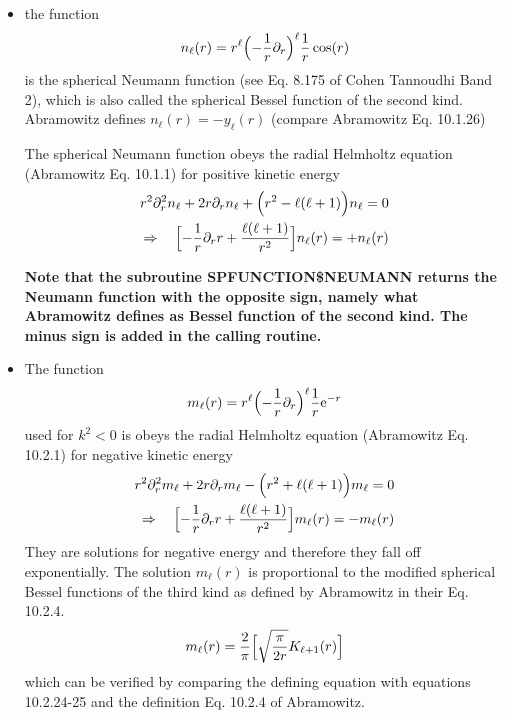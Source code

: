 \documentclass[11pt,a4paper]{report}
\begin{document}
\begin{itemize}
\item the function
\begin{eqnarray}
n_\ell(r)=r^\ell\Bigl(-\frac{1}{r}\partial_r\Bigr)^\ell\frac{1}{r}\cos(r)
\label{eq:defneumann}
\end{eqnarray}
is the spherical Neumann function (see Eq. 8.175 of Cohen Tannoudhi
Band 2), which is also called the spherical Bessel function of the
second kind. Abramowitz defines $n_\ell(r)=-y_\ell(r)$ (compare
Abramowitz Eq. 10.1.26)

The spherical Neumann function obeys the radial Helmholtz equation
(Abramowitz Eq. 10.1.1) for positive kinetic energy
\begin{eqnarray}
r^2\partial^2_r n_\ell+2r\partial_r n_\ell+\Bigl(r^2-\ell(\ell+1)\Bigr) n_\ell=0
\nonumber\\
\Rightarrow\quad
\Bigl[-\frac{1}{r}\partial_r r +\frac{\ell(\ell+1)}{r^2}\Bigr]
n_\ell(r)=+n_\ell(r)
\end{eqnarray}

\textbf{Note that the subroutine SPFUNCTION\$NEUMANN returns the
  Neumann function with the opposite sign, namely what Abramowitz
  defines as Bessel function of the second kind. The minus sign is
  added in the calling routine.}
%
\item The function 
\begin{eqnarray}
m_\ell(r)=r^\ell\Bigl(-\frac{1}{r}\partial_r\Bigr)^\ell\frac{1}{r}\mathrm{e}^{-r}
\label{eq:defml}
\end{eqnarray}
used for $k^2<0$ is obeys the radial Helmholtz equation (Abramowitz
Eq. 10.2.1) for negative kinetic energy
\begin{eqnarray}
r^2\partial^2_r m_\ell
+2r\partial_r m_\ell
-\Bigl(r^2+\ell(\ell+1)\Bigr) m_\ell=0
\nonumber\\
\Rightarrow\quad
\Bigl[-\frac{1}{r}\partial_r r +\frac{\ell(\ell+1)}{r^2}\Bigr]
m_\ell(r)=-m_\ell(r)
\end{eqnarray}
They are solutions for negative energy and therefore they fall off
exponentially.  The solution $m_\ell(r)$ is proportional to the
modified spherical Bessel functions of the third kind as defined by
Abramowitz\cite{abramowitz64_book} in their Eq. 10.2.4.
\begin{eqnarray}
m_\ell(r)=\frac{2}{\pi} \Bigl[\sqrt{\frac{\pi}{2r}} K_{\ell+1}(r)\Bigr]
\end{eqnarray}
which can be verified by comparing the defining equation 
with equations 10.2.24-25 and the definition Eq. 10.2.4 of Abramowitz.
\end{itemize}

\clearpage
 
\end{document}
